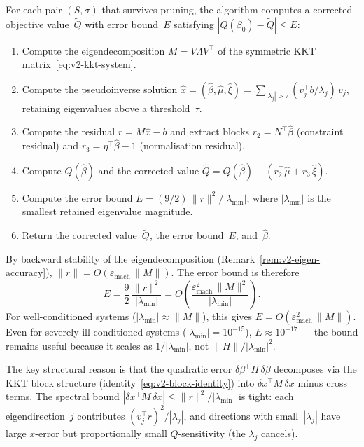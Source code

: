 \begin{algorithm}%
\label{alg:v2-q-interval}
For each pair $(S, \sigma)$ that survives pruning,
the algorithm computes a corrected objective
value~$\tilde Q$ with error bound~$E$
satisfying $|Q(\beta_0) - \tilde Q| \leq E$:
\begin{enumerate}
\item Compute the eigendecomposition
  $M = V \Lambda V^\top$ of the symmetric KKT
  matrix~\eqref{eq:v2-kkt-system}.
\item Compute the pseudoinverse solution
  $\hat x = (\hat\beta, \hat\mu, \hat\xi)
    = \sum_{|\lambda_j| > \tau}
      (v_j^\top b / \lambda_j)\, v_j$,
  retaining eigenvalues above a threshold~$\tau$.
\item Compute the residual $r = M\hat x - b$ and
  extract blocks $r_2 = N^\top\hat\beta$
  (constraint residual)
  and $r_3 = \eta^\top\hat\beta - 1$
  (normalisation residual).
\item Compute $Q(\hat\beta)$ and the corrected value
  $\tilde Q = Q(\hat\beta)
    - (r_2^\top\hat\mu + r_3\,\hat\xi)$.
\item Compute the error bound
  $E = (9/2)\,\|r\|^2 / |\lambda_{\min}|$,
  where $|\lambda_{\min}|$ is the smallest
  retained eigenvalue magnitude.
\item Return the corrected value~$\tilde Q$,
  the error bound~$E$, and~$\hat\beta$.
\end{enumerate}
\end{algorithm}

\begin{remark}%
\label{rem:v2-interval-width}
By backward stability of the eigendecomposition
(Remark~\ref{rem:v2-eigen-accuracy}),
$\|r\| = O(\varepsilon_{\mathrm{mach}}\,\|M\|)$.
The error bound is therefore
\[
  E
  = \frac{9}{2}\,
    \frac{\|r\|^2}{|\lambda_{\min}|}
  = O\!\left(
    \frac{\varepsilon_{\mathrm{mach}}^2\,\|M\|^2}
         {|\lambda_{\min}|}
  \right).
\]
For well-conditioned systems
($|\lambda_{\min}| \approx \|M\|$),
this gives $E = O(\varepsilon_{\mathrm{mach}}^2\,\|M\|)$.
Even for severely ill-conditioned systems
($|\lambda_{\min}| = 10^{-15}$),
$E \approx 10^{-17}$ --- the bound remains useful
because it scales as $1/|\lambda_{\min}|$,
not $\|H\|/|\lambda_{\min}|^2$.

The key structural reason is that the quadratic
error $\delta\beta^\top H\,\delta\beta$ decomposes
via the KKT block structure
(identity~\eqref{eq:v2-block-identity})
into $\delta x^\top M\,\delta x$ minus cross terms.
The spectral bound
$|\delta x^\top M\,\delta x| \leq \|r\|^2/|\lambda_{\min}|$
is tight: each eigendirection~$j$ contributes
$(v_j^\top r)^2/|\lambda_j|$,
and directions with small~$|\lambda_j|$
have large $x$-error but proportionally small
$Q$-sensitivity (the $\lambda_j$ cancels).
\end{remark}

